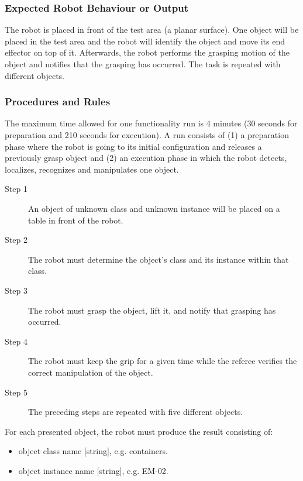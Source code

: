 \subsubsection{Expected Robot Behaviour or Output}
\label{sssec:FBMManipulationOutput}

The robot is placed in front of the test area (a planar surface).
One object will be placed in the test area and 
the robot will identify the object and move its end effector on top of it. 
Afterwards, the robot performs the grasping motion of the object and notifies that the grasping has occurred.
The task is repeated with different objects.



\subsubsection{Procedures and Rules}
\label{sssec:FBMManipulationProcedures}

The maximum time allowed for one functionality run is 4 minutes (30 seconds for preparation and 210 seconds for execution). A run consists of (1) a preparation phase where the robot is going to its initial configuration and releases a previously grasp object and (2) an execution phase in which the robot detects, localizes, recognizes and manipulates one object.

\begin{description}
\item[Step 1] An object of unknown class and unknown instance will be placed on a table in front of the robot.
\item[Step 2] The robot must determine the object’s class and its instance within that class.
\item[Step 3] The robot must grasp the object, lift it, and notify that grasping has occurred.
\item[Step 4] The robot must keep the grip for a given time while the referee verifies the correct manipulation of the object.
\item[Step 5] The preceding steps are repeated with five different objects.
\end{description} 

For each presented object, the robot must produce the result consisting of:
\begin{itemize}
    \item object class name [string], e.g. containers.
    \item object instance name [string], e.g. EM-02.
\end{itemize}

